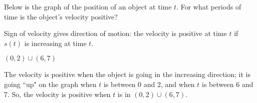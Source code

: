 \begin{Mquestion}Below is the graph of the position of an object at time $t$. For what periods of time is the object's velocity positive?
\begin{center}
\end{center}
\end{Mquestion}
\begin{hint}
Sign of velocity gives direction of motion:
the velocity is positive at time $t$ if $s(t)$ is
            increasing at time $t$.
\end{hint}
\begin{answer}
$(0,2) \cup (6,7)$
\end{answer}
\begin{solution}
The velocity is positive when the object is going in the increasing direction; it is going ``up" on the graph when $t$ is between 0 and 2, and when $t$ is between $6$ and $7$. So, the velocity is positive when $t$ is in $(0,2) \cup (6,7)$.
\end{solution}




